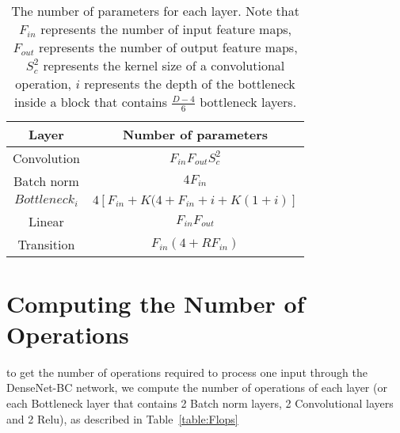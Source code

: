 \documentclass{article}
\begin{document}
\begin{table}[h]
    \centering
    \begin{tabular}{c|c}
    Layer     & Number of parameters  \\
    \hline
    Convolution     &      $F_{in}F_{out}S_c^2$ \\
    \hline
    Batch norm & $4F_{in}$ \\
    \hline
    $Bottleneck_i$ & $ 4[F_{in} + K(4 + F_{in} + i + K(1 + i)]$\\
    \hline
    Linear & $F_{in}F_{out}$\\
    \hline
    Transition & $F_{in}(4 + RF_{in})$ \\
    \hline
    \end{tabular}
    \caption{The number of parameters for each layer. Note that $F_{in}$ represents the number of input feature maps, $F_{out}$ represents the number of output feature maps, $S_c^2$ represents the kernel size of a convolutional operation, $i$ represents the depth of the bottleneck inside a block that contains $\frac{D-4}{6}$ bottleneck layers.}
    \label{table:params}
\end{table}

\section{Computing the Number of Operations}

to get the number of operations required to process one input through the  DenseNet-BC network, we compute the number of operations of each layer (or each Bottleneck layer that contains 2 Batch norm layers, 2 Convolutional layers and 2 Relu), as described in Table~\ref{table:Flops}
\end{document}
